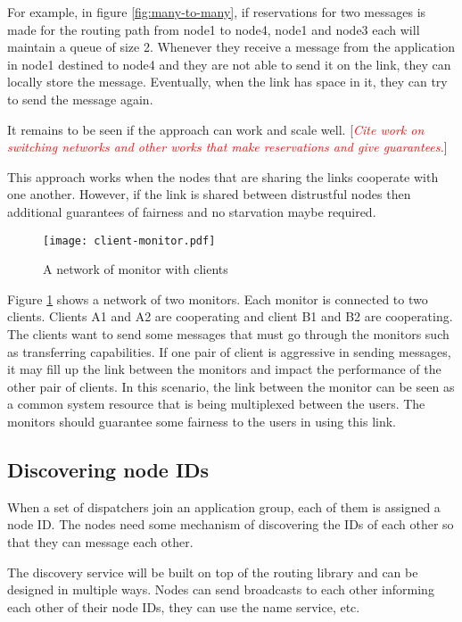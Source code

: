 \documentclass[a4paper,twoside]{report} %
\newcommand{\note}[1]{[\textcolor{red}{\textit{#1}}]}
\begin{document}
For example, in figure \ref{fig:many-to-many},
if reservations for two messages is made for the routing path
from node1 to node4, node1 and node3 each will maintain a queue of size 2.
Whenever they receive a message from the application in node1 destined to node4
and they are not able to send it on the link,
they can locally store the message.
Eventually, when the link has space in it,
they can try to send the message again.

It remains to be seen if the approach can work and scale well.
\note{Cite work on switching networks and other works that make reservations and
  give guarantees.}

This approach works when the nodes that are sharing the links
cooperate with one another.
However, if the link is shared between distrustful
nodes then additional guarantees of fairness and no starvation maybe required.

\begin{figure}[t]
 \texttt{[image: client-monitor.pdf]}
 \caption{A network of monitor with clients}\label{fig:client-monitor}
\end{figure}

Figure \ref{fig:client-monitor} shows a network of two monitors.
Each monitor is connected to two clients.
Clients A1 and A2 are cooperating and client B1 and B2 are cooperating.
The clients want to send some messages that must go through the monitors such as
transferring capabilities.
If one pair of client is aggressive in sending messages,
it may fill up the link between the monitors and impact the performance
of the other pair of clients.
In this scenario, the link between the monitor can be seen
as a common system resource that is being multiplexed between the users.
The monitors should guarantee some fairness to the users in using this link.

\subsection{Discovering node IDs}
When a set of dispatchers join an application group,
each of them is assigned a node ID.
The nodes need some mechanism of discovering the IDs of each other
so that they can message each other.

The discovery service will be built on top of the routing library
and can be designed in multiple ways.
Nodes can send broadcasts to each other informing each other of their node IDs,
they can use the name service, etc.
\end{document}
